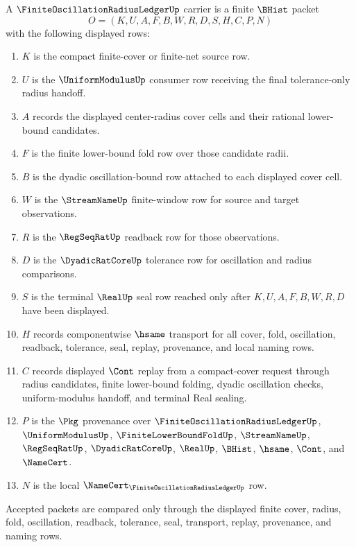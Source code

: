 \begin{definition}
\label{def:finite-oscillation-radius-ledger-carrier}
A $\FiniteOscillationRadiusLedgerUp$ carrier is a finite $\BHist$ packet
$$
O=(K,U,A,F,B,W,R,D,S,H,C,P,N)
$$
with the following displayed rows:
\begin{enumerate}
\item $K$ is the compact finite-cover or finite-net source row.
\item $U$ is the $\UniformModulusUp$ consumer row receiving the final tolerance-only radius handoff.
\item $A$ records the displayed center-radius cover cells and their rational lower-bound candidates.
\item $F$ is the finite lower-bound fold row over those candidate radii.
\item $B$ is the dyadic oscillation-bound row attached to each displayed cover cell.
\item $W$ is the $\StreamNameUp$ finite-window row for source and target observations.
\item $R$ is the $\RegSeqRatUp$ readback row for those observations.
\item $D$ is the $\DyadicRatCoreUp$ tolerance row for oscillation and radius comparisons.
\item $S$ is the terminal $\RealUp$ seal row reached only after $K,U,A,F,B,W,R,D$ have been displayed.
\item $H$ records componentwise $\hsame$ transport for all cover, fold, oscillation, readback, tolerance, seal, replay, provenance, and local naming rows.
\item $C$ records displayed $\Cont$ replay from a compact-cover request through radius candidates, finite lower-bound folding, dyadic oscillation checks, uniform-modulus handoff, and terminal Real sealing.
\item $P$ is the $\Pkg$ provenance over $\FiniteOscillationRadiusLedgerUp$, $\UniformModulusUp$, $\FiniteLowerBoundFoldUp$, $\StreamNameUp$, $\RegSeqRatUp$, $\DyadicRatCoreUp$, $\RealUp$, $\BHist$, $\hsame$, $\Cont$, and $\NameCert$.
\item $N$ is the local $\NameCert_{\FiniteOscillationRadiusLedgerUp}$ row.
\end{enumerate}
Accepted packets are compared only through the displayed finite cover, radius, fold, oscillation, readback, tolerance, seal, transport, replay, provenance, and naming rows.
\end{definition}

